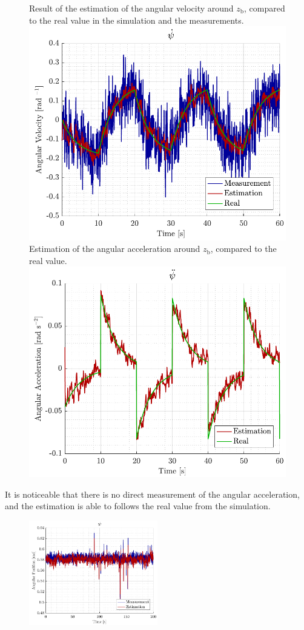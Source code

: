\begin{figure}[H]
    \captionbox 
    {   
        Result of the estimation of the angular velocity around $z_\mathrm{b}$, compared to the real value in the simulation and the measurements.
        \label{fig:sim_yawdot}
    }                                                                 
    {                                                                  
        \includegraphics[width=.45\textwidth]{figures/sim_yawdot}         
    }                                                                    
    \hspace{5pt}                                                          
    \captionbox  
    {      
        Estimation of the angular acceleration around $z_\mathrm{b}$, compared to the real value.
        \label{fig:sim_yawddot}
    }                                                                          
    {
        \includegraphics[width=.45\textwidth]{figures/sim_yawddot}
    }
\end{figure}
%
It is noticeable that there is no direct measurement of the angular acceleration, and the estimation is able to follows the real value from the simulation.

\begin{figure}[H]
    \includegraphics[width=0.5\textwidth]{figures/real_yaw}
    \caption{}
    \label{fig:real_yaw}
\end{figure}

